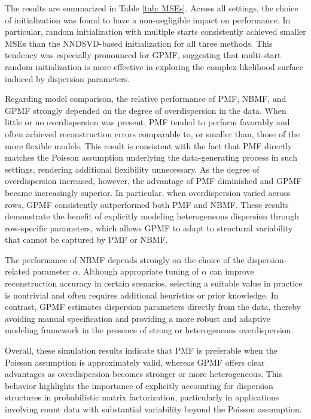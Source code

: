 \documentclass[pdflatex,sn-basic]{sn-jnl}%
\theoremstyle{thmstyleone}%
\theoremstyle{thmstyletwo}%
\theoremstyle{thmstylethree}%
\begin{document}
The results are summarized in Table \ref{tab: MSEs}. Across all settings, the choice of initialization was found to have a non-negligible impact on performance. In particular, random initialization with multiple starts consistently achieved smaller MSEs than the NNDSVD-based initialization for all three methods. This tendency was especially pronounced for GPMF, suggesting that multi-start random initialization is more effective in exploring the complex likelihood surface induced by dispersion parameters.

Regarding model comparison, the relative performance of PMF, NBMF, and GPMF strongly depended on the degree of overdispersion in the data. When little or no overdispersion was present, PMF tended to perform favorably and often achieved reconstruction errors comparable to, or smaller than, those of the more flexible models. This result is consistent with the fact that PMF directly matches the Poisson assumption underlying the data-generating process in such settings, rendering additional flexibility unnecessary. As the degree of overdispersion increased, however, the advantage of PMF diminished and GPMF became increasingly superior. In particular, when overdispersion varied across rows, GPMF consistently outperformed both PMF and NBMF. These results demonstrate the benefit of explicitly modeling heterogeneous dispersion through row-specific parameters, which allows GPMF to adapt to structural variability that cannot be captured by PMF or NBMF.

The performance of NBMF depends strongly on the choice of the dispersion-related parameter $\alpha$. Although appropriate tuning of $\alpha$ can improve reconstruction accuracy in certain scenarios, selecting a suitable value in practice is nontrivial and often requires additional heuristics or prior knowledge. In contrast, GPMF estimates dispersion parameters directly from the data, thereby avoiding manual specification and providing a more robust and adaptive modeling framework in the presence of strong or heterogeneous overdispersion.

Overall, these simulation results indicate that PMF is preferable when the Poisson assumption is approximately valid, whereas GPMF offers clear advantages as overdispersion becomes stronger or more heterogeneous. This behavior highlights the importance of explicitly accounting for dispersion structures in probabilistic matrix factorization, particularly in applications involving count data with substantial variability beyond the Poisson assumption.
\end{document}
